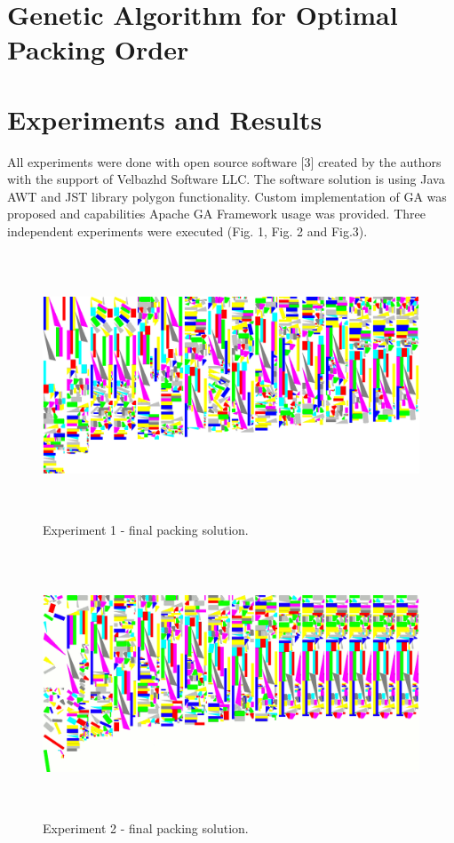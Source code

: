 \documentclass{llncs}
\begin{document}
\section{Genetic Algorithm for Optimal Packing Order}
%
%
\section{Experiments and Results}
%
All experiments were done with open source software [3] created by the authors with the support of Velbazhd Software LLC. The software solution is using Java AWT and JST library polygon functionality. Custom implementation of GA was proposed and capabilities Apache GA Framework usage was provided. Three independent experiments were executed (Fig. 1, Fig. 2 and Fig.3).
%
\begin{figure}
	\centering
	\includegraphics[width=12.62cm,height=7.88cm]{fig01.png}
	\caption{Experiment 1 - final packing solution.}
	\label{fig:Graph}
\end{figure}
%
\begin{figure}
	\centering
	\includegraphics[width=12.62cm,height=7.88cm]{fig02.png}
	\caption{Experiment 2 - final packing solution.}
	\label{fig:Graph}
\end{figure}
\end{document}
